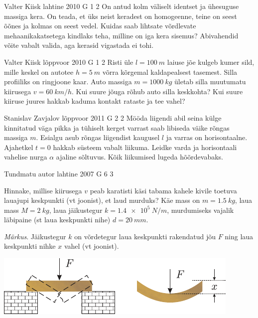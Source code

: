 \documentclass[11pt]{article}
\begin{document}
{%
{Valter Kiisk} %
{lahtine} %
{2010} %
{G 1} %
{2} %
{
\ifStatement
On antud kolm väliselt identset ja ühesuguse massiga kera. On teada, et üks
neist keradest on homogeenne, teine on seest õõnes ja kolmas on seest vedel.
Kuidas saab lihtsate võrdlevate mehaanikakatsetega kindlaks teha, milline on iga
kera sisemus? Abivahendid võite vabalt valida, aga kerasid vigastada ei tohi.
\fi
}

{Valter Kiisk} %
{lõppvoor} %
{2010} %
{G 1} %
{2} %
{
\ifStatement
Risti üle $l=\SI{100}{m}$ laiuse jõe kulgeb kumer sild, mille keskel on
autotee $h=\SI{5}{m}$ võrra kõrgemal kaldapealsest tasemest. Silla profiiliks on
ringjoone kaar. Auto massiga $m=\SI{1000}{kg}$ ületab silla muutumatu kiirusega $v=\SI{60}{km/h}$.
Kui suure jõuga rõhub auto silla keskkohta? Kui suure kiiruse juures hakkab kaduma
kontakt rataste ja tee vahel?
\fi
}

{Stanislav Zavjalov} %
{lõppvoor} %
{2011} %
{G 2} %
{2} %
{
\ifStatement
Mööda liigendi abil seina külge kinnitatud väga pikka ja tühiselt
kerget varrast saab libiseda väike rõngas massiga $m$. Esialgu asub rõngas liigendist kaugusel $l$ ja varras on horisontaalne. Ajahetkel $t = \num{0}$ hakkab süsteem
vabalt liikuma. Leidke varda ja horisontaali vahelise nurga $\alpha$ ajaline sõltuvus.
Kõik liikumised lugeda hõõrdevabaks. 
\fi
}

{Tundmatu autor} %
{lahtine} %
{2007} %
{G 6} %
{3} %
{
\ifStatement
Hinnake, millise kiirusega $v$ peab karatisti käsi tabama kahele kivile toetuva lauajupi keskpunkti (vt joonist), et laud murduks? Käe mass on $m = \SI{1,5}{kg}$, laua mass $M = \SI{2}{kg}$, laua jäikustegur $k = \SI{1,4e5}{N/m}$, murdumiseks vajalik läbipaine (st laua keskpunkti nihe) $d = \SI{20}{mm}$. 

\emph{Märkus}. Jäikustegur $k$ on võrdetegur laua keskpunkti rakendatud jõu $F$ ning laua keskpunkti nihke $x$ vahel (vt joonist).

\begin{center}
	\includegraphics[width=0.8\linewidth]{2007-lahg-06-yl}
\end{center}
\fi
}

}
\end{document}
